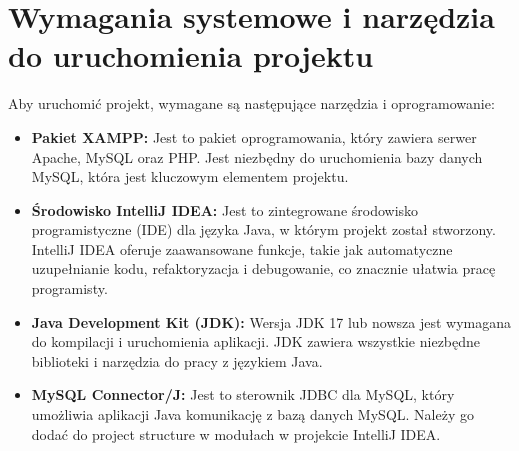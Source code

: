 \section{Wymagania systemowe i narzędzia do uruchomienia projektu}
Aby uruchomić projekt, wymagane są następujące narzędzia i oprogramowanie:
\begin{itemize}
    \item \textbf{Pakiet XAMPP:} Jest to pakiet oprogramowania, który zawiera serwer Apache, MySQL oraz PHP. Jest niezbędny do uruchomienia bazy danych MySQL, która jest kluczowym elementem projektu.
    \item \textbf{Środowisko IntelliJ IDEA:} Jest to zintegrowane środowisko programistyczne (IDE) dla języka Java, w którym projekt został stworzony. IntelliJ IDEA oferuje zaawansowane funkcje, takie jak automatyczne uzupełnianie kodu, refaktoryzacja i debugowanie, co znacznie ułatwia pracę programisty. 
    \item \textbf{Java Development Kit (JDK):} Wersja JDK 17 lub nowsza jest wymagana do kompilacji i uruchomienia aplikacji. JDK zawiera wszystkie niezbędne biblioteki i narzędzia do pracy z językiem Java.
    \item \textbf{MySQL Connector/J:} Jest to sterownik JDBC dla MySQL, który umożliwia aplikacji Java komunikację z bazą danych MySQL. Należy go dodać do project structure w modułach w projekcie IntelliJ IDEA.
\end{itemize}

    


